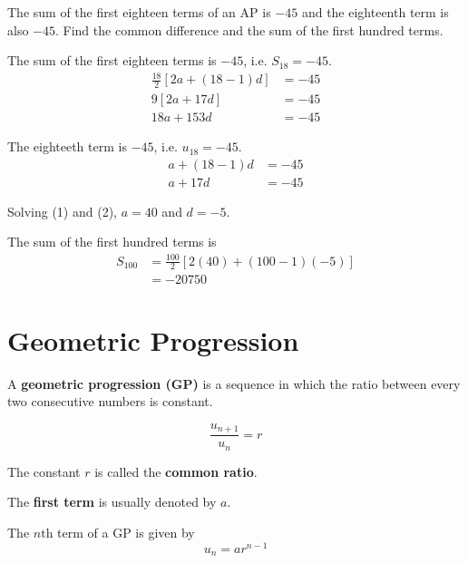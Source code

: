 \documentclass[11pt,a4paper]{book}
\begin{document}
\begin{example}

The sum of the first eighteen terms of an AP is $-45$ and the eighteenth term is also $-45$. Find the common difference and the sum of the first hundred terms.

\Solution

The sum of the first eighteen terms is $-45$, i.e. $S_{18}=-45$.
\begin{align*}
\frac{18}{2}\left[2a+\left(18-1\right)d\right] & =-45\\
9\left[2a+17d\right] & =-45\\
18a+153d & =-45\tag{1}
\end{align*}

The eighteeth term is $-45$, i.e. $u_{18}=-45$.
\begin{align*}
a+\left(18-1\right)d & =-45\\
a+17d & =-45\tag{2}
\end{align*}

Solving (1) and (2), $a=40$ and $d=-5$.

The sum of the first hundred terms is 
\begin{align*}
S_{100} & =\frac{100}{2}\left[2\left(40\right)+\left(100-1\right)\left(-5\right)\right]\\
 & =-20750
\end{align*}

\end{example}

\section{Geometric Progression}

\begin{tcolorbox}[colback=blue!5, colframe=black, boxrule=.4pt, sharpish corners]

A \textbf{geometric progression (GP)} is a sequence in which the ratio
between every two consecutive numbers is constant.

\[
\frac{u_{n+1}}{u_{n}}=r
\]

The constant $r$ is called the \textbf{common ratio}.

\medskip{}

The \textbf{first term} is usually denoted by $a$. 

\medskip{}

The $n\text{th}$ term of a GP is given by 
\[
u_{n}=ar^{n-1}
\]
\end{tcolorbox}
\end{document}
